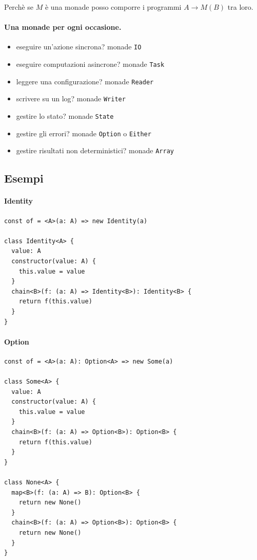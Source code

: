 \documentclass[12pt]{article}
\begin{document}
Perchè se $M$ è una monade posso comporre i programmi $A \rightarrow M(B)$ tra loro.

\paragraph{Una monade per ogni occasione.}

\begin{itemize}
  \item eseguire un'azione sincrona? monade \texttt{IO}
  \item eseguire computazioni asincrone? monade \texttt{Task}
  \item leggere una configurazione? monade \texttt{Reader}
  \item scrivere su un log? monade \texttt{Writer}
  \item gestire lo stato? monade \texttt{State}
  \item gestire gli errori? monade \texttt{Option} o \texttt{Either}
  \item gestire risultati non deterministici? monade \texttt{Array}
\end{itemize}

\subsection{Esempi}

\paragraph{Identity}

\begin{verbatim}
const of = <A>(a: A) => new Identity(a)

class Identity<A> {
  value: A
  constructor(value: A) {
    this.value = value
  }
  chain<B>(f: (a: A) => Identity<B>): Identity<B> {
    return f(this.value)
  }
}
\end{verbatim}

\paragraph{Option}

\begin{verbatim}
const of = <A>(a: A): Option<A> => new Some(a)

class Some<A> {
  value: A
  constructor(value: A) {
    this.value = value
  }
  chain<B>(f: (a: A) => Option<B>): Option<B> {
    return f(this.value)
  }
}

class None<A> {
  map<B>(f: (a: A) => B): Option<B> {
    return new None()
  }
  chain<B>(f: (a: A) => Option<B>): Option<B> {
    return new None()
  }
}
\end{verbatim}
\end{document}
